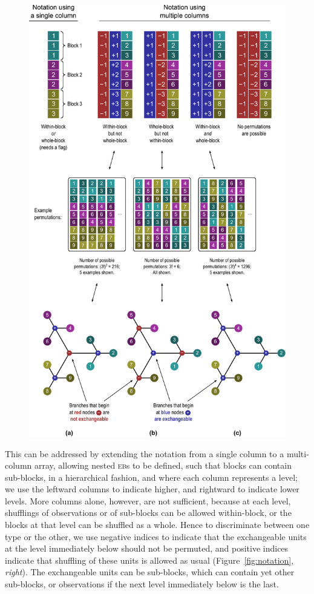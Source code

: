 \begin{figure}[!p]
\centering
\includegraphics{figures/notation.pdf}
\label{fig:notation_noref}
\end{figure}

This can be addressed by extending the notation from a single column to a multi-column array, allowing nested \textsc{eb}s to be defined, such that blocks can contain sub-blocks, in a hierarchical fashion, and where each column represents a level; we use the leftward columns to indicate higher, and rightward to indicate lower levels. More columns alone, however, are not sufficient, because at each level, shufflings of observations or of sub-blocks can be allowed within-block, or the blocks at that level can be shuffled as a whole. Hence to discriminate between one type or the other, we use negative indices to indicate that the exchangeable units at the level immediately below should not be permuted, and positive indices indicate that shuffling of these units is allowed as usual (Figure~\ref{fig:notation}, \emph{right}). The exchangeable units can be sub-blocks, which can contain yet other sub-blocks, or observations if the next level immediately below is the last.

